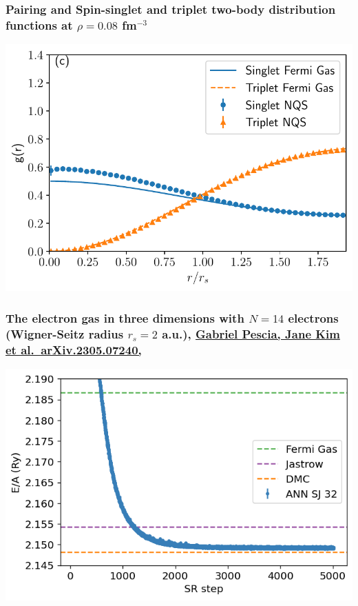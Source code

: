 \documentclass{beamer}
\begin{document}
\begin{frame}
\frametitle{Pairing and Spin-singlet and triplet two-body distribution functions at $\rho=0.08$ fm$^{-3}$}

\begin{block}{}

\vspace{6mm}

\centerline{\includegraphics[width=0.9\linewidth]{figures/08_tbd.pdf}}

\vspace{6mm}

\end{block}
\end{frame}

\begin{frame}
\frametitle{The electron gas in three dimensions with $N=14$ electrons (Wigner-Seitz radius $r_s=2$ a.u.), \href{{https://doi.org/10.48550/arXiv.2305.07240}}{Gabriel Pescia, Jane Kim et al.~arXiv.2305.07240,}}

\begin{block}{}

\vspace{6mm}

\centerline{\includegraphics[width=0.9\linewidth]{figures/elgasnew.png}}

\vspace{6mm}

\end{block}
\end{frame}
\end{document}
